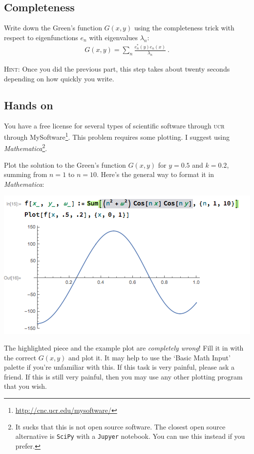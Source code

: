\documentclass[12pt]{article}
\newcommand{\acro}[1]{\textsc{\MakeLowercase{#1}}}
\numberwithin{equation}{section}    %
\begin{document}
\subsection{Completeness}


Write down the Green's function $G(x,y)$ using the completeness trick with respect to eigenfunctions $e_n$ with eigenvalues $\lambda_n$: 
\begin{align}
	G(x,y) = \sum_n \frac{e_n^*(y)e_n(x)}{\lambda_n} \ .
\end{align}

\textsc{Hint:} Once you did the previous part, this step takes about twenty seconds depending on how quickly you write.


\subsection{Hands on}

You have a free license for several types of scientific software 
through \acro{UCR} through MySoftware\footnote{\url{http://cnc.ucr.edu/mysoftware/}}. This problem requires some plotting. I suggest using \emph{Mathematica}\footnote{It sucks that this is not open source software. The closest open source alternative is \texttt{SciPy} with a \texttt{Jupyer} notebook. You can use this instead if you prefer.}. 

Plot the solution to the Green's function $G(x,y)$ for $y = 0.5$ and $k = 0.2$, summing from $n=1$ to $n=10$. Here's the general way to format it in \emph{Mathematica}:
\begin{center}
	\includegraphics[width=.6\textwidth]{P231_2017_HW4_fig1.png}
\end{center}

The highlighted piece and the example plot are \emph{completely wrong}! Fill it in with the correct $G(x,y)$ and plot it. It may help to use the `Basic Math Input' palette if you're unfamiliar with this. If this task is very painful, please ask a friend. If this is still very painful, then you may use any other plotting program that you wish. 
\end{document}
